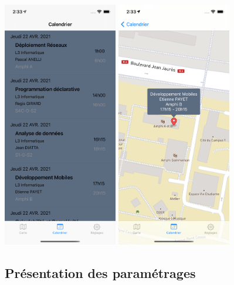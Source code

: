 \documentclass{article}
\begin{document}
\begin{center}
    \includegraphics[width=50mm, scale=0.5]{calendar.png}
    \includegraphics[width=50mm, scale=0.5]{calendar_position.png}
\end{center}



\newpage %



\subsection{Présentation des paramétrages}
\end{document}
